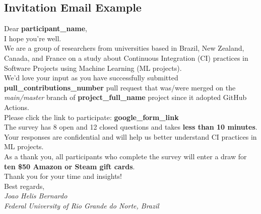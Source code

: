 	
\appendixtitleon
\appendixtitletocon
\begin{appendices}

\section{Invitation Email Example}
\label{sec:appendix_invitation_email_example}

\begin{tcolorbox}[colframe=black!75, colback=white!95, title=SUBJECT - Help us understand CI in ML: Your Experience is Essential,
fonttitle=\normalsize]
\normalsize

Dear \textbf{participant\_name}, \\

I hope you're well. \\

We are a group of researchers from universities based in Brazil, New Zealand, Canada, and France on a study about Continuous Integration (CI) practices in Software Projects using Machine Learning (ML projects). \\

We'd love your input as you have successfully submitted \textbf{{ pull\_contributions\_number }} pull request that was/were merged on the \textit{main/master} branch of \textbf{{ project\_full\_name }} project since it adopted GitHub Actions. \\

Please click the link to participate: \textbf{{ google\_form\_link}} \\

The survey has 8 open and 12 closed questions and takes \textbf{less than 10
minutes}. Your responses are confidential and will help us better understand CI practices in ML projects. \\

As a thank you, all participants who complete the survey will enter 
a draw for \textbf{ten \$50 Amazon or Steam gift cards}. \\

Thank you for your time and insights! \\

Best regards, \\

\textit{Joao Helis Bernardo} \\
\textit{Federal University of Rio Grande do Norte, Brazil}

\end{tcolorbox}


\end{appendices}
